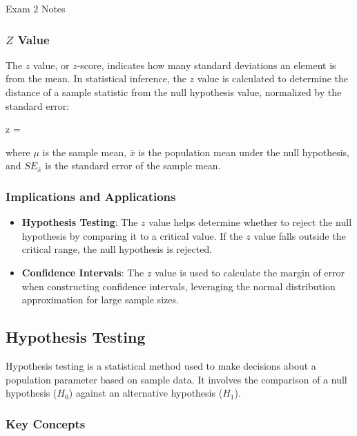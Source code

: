 \begin{examnotes}{Exam 2 Notes}
    \subsubsection*{$Z$ Value}
    
    The $z$ value, or $z$-score, indicates how many standard deviations an element is from the mean. In statistical inference, the $z$ value is calculated to determine the distance of a sample statistic 
    from the null hypothesis value, normalized by the standard error:
    
    \begin{center}
        \begin{highlightbox}
            z = 
        \end{highlightbox}
    \end{center}
    where $\mu$ is the sample mean, $\bar{x}$ is the population mean under the null hypothesis, and $SE_{\bar{x}}$ is the standard error of the sample mean.
    
    \subsubsection*{Implications and Applications}
    
    \begin{itemize}
        \item \textbf{Hypothesis Testing}: The $z$ value helps determine whether to reject the null hypothesis by comparing it to a critical value. If the $z$ value falls outside the critical range, 
        the null hypothesis is rejected.
        \item \textbf{Confidence Intervals}: The $z$ value is used to calculate the margin of error when constructing confidence intervals, leveraging the normal distribution approximation for large sample sizes.
    \end{itemize}

    \subsection*{Hypothesis Testing}

    Hypothesis testing is a statistical method used to make decisions about a population parameter based on sample data. It involves the comparison of a null hypothesis ($H_0$) against an alternative 
    hypothesis ($H_1$).
    
    \subsubsection*{Key Concepts}
    

\end{examnotes}
